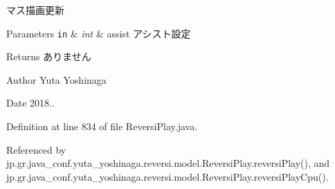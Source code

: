 マス描画更新 


\begin{DoxyParams}[1]{Parameters}
\mbox{\tt in}  & {\em int} & assist アシスト設定 \\
\hline
\end{DoxyParams}
\begin{DoxyReturn}{Returns}
ありません 
\end{DoxyReturn}
\begin{DoxyAuthor}{Author}
Yuta Yoshinaga 
\end{DoxyAuthor}
\begin{DoxyDate}{Date}
2018.. 
\end{DoxyDate}


Definition at line 834 of file Reversi\+Play.\+java.



Referenced by jp.\+gr.\+java\+\_\+conf.\+yuta\+\_\+yoshinaga.\+reversi.\+model.\+Reversi\+Play.\+reversi\+Play(), and jp.\+gr.\+java\+\_\+conf.\+yuta\+\_\+yoshinaga.\+reversi.\+model.\+Reversi\+Play.\+reversi\+Play\+Cpu().

